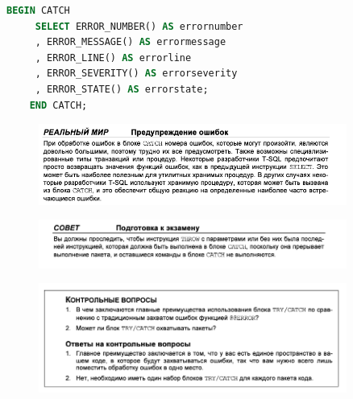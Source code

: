 \begin{lstlisting}[label=lst:funcReturn, language=sql]
	BEGIN CATCH
	 SELECT ERROR_NUMBER() AS errornumber
	 , ERROR_MESSAGE() AS errormessage
	 , ERROR_LINE() AS errorline
	 , ERROR_SEVERITY() AS errorseverity
	 , ERROR_STATE() AS errorstate;
	END CATCH; 
\end{lstlisting}

\begin{figure}[h!]
	\begin{center}
		\includegraphics[width=0.9\textwidth]{img/advice34.png}
	\end{center}
	\captionsetup{justification=centering}
\end{figure}

\begin{figure}[h!]
	\begin{center}
		\includegraphics[width=0.9\textwidth]{img/advice35.png}
	\end{center}
	\captionsetup{justification=centering}
\end{figure}

\begin{figure}[h!]
	\begin{center}
		\includegraphics[width=0.9\textwidth]{img/control34.png}
	\end{center}
	\captionsetup{justification=centering}
\end{figure}

		
